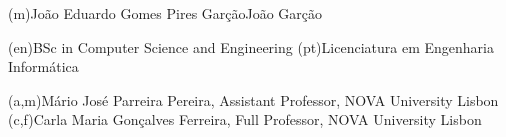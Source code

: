 %
%
\ntauthorname(m){João Eduardo Gomes Pires Garção}{João Garção}



%
%
%
\ntauthordegree(en){BSc in Computer Science and Engineering}
\ntauthordegree(pt){Licenciatura em Engenharia Informática}



%
%
%

%
%



%
%
%
%
(a,m){Mário José Parreira Pereira, Assistant Professor, NOVA University Lisbon}
(c,f){Carla Maria Gonçalves Ferreira, Full Professor, NOVA University Lisbon}



